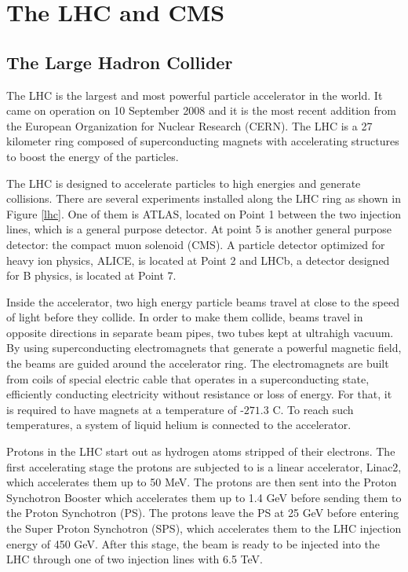 
\chapter{The LHC and CMS}

\section{The Large Hadron Collider}

The LHC is the largest and most powerful particle accelerator in the world. It came on operation on 10 September 2008 and it is the most recent addition from the European Organization for Nuclear Research (CERN). The LHC is a 27 kilometer ring composed of superconducting magnets with accelerating structures to boost the energy of the particles. 

The LHC is designed to accelerate particles to high energies and generate collisions. There are several
experiments installed along the LHC ring as shown in Figure \ref{lhc}. One of them is ATLAS, located on Point 1 between the two injection lines, which is a general purpose detector. At point 5 is another general purpose detector: the compact muon solenoid (CMS). A particle detector optimized for heavy ion physics, ALICE, is located at Point 2 and LHCb, a detector designed for B physics, is located at Point 7\cite{cern1,cern2}.

Inside the accelerator, two high energy particle beams travel at
close to the speed of light before they collide. 
In order to make them collide, beams travel in opposite directions in separate beam pipes, 
two tubes kept at ultrahigh vacuum. 
By using superconducting electromagnets that generate a powerful magnetic field, the beams are guided around the accelerator ring. 
The electromagnets are built from coils of special electric cable that operates in a superconducting state, efficiently conducting electricity without resistance or loss of energy. For that, it is required to have magnets at a temperature of $‑271.3$ C. 
To reach such temperatures, a system of liquid helium is connected to the accelerator\cite{cern2}.

Protons in the LHC start out as hydrogen atoms stripped of their electrons. The first accelerating stage the protons are subjected to is a linear accelerator, Linac2,
which accelerates them up to 50 MeV. The protons are then sent into the
Proton Synchotron Booster which accelerates them up to 1.4 GeV before sending them to the Proton Synchotron (PS). The protons leave the PS at 25 GeV before entering the Super Proton Synchotron (SPS), which accelerates them to the LHC injection energy of 450 GeV. After this stage, the beam is ready to be injected into
the LHC through one of two injection lines with 6.5 TeV\cite{cern3}.

